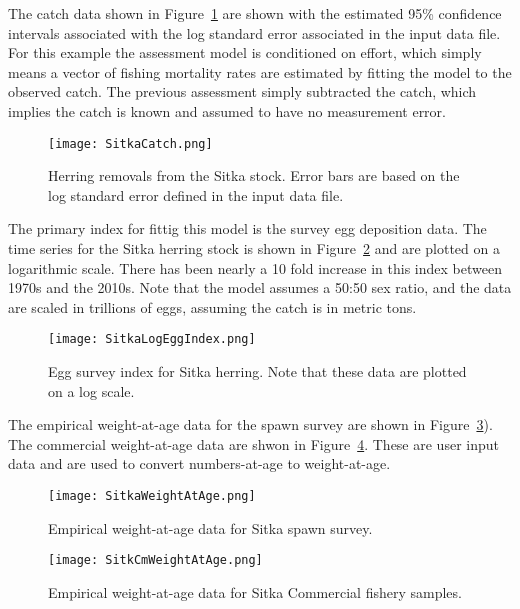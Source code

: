 \documentclass[12pt,letterpaper]{article}
\begin{document}
  The catch data shown in Figure~\ref{fig:SitkaCatch} are shown with the estimated 95\% confidence intervals associated with the log standard error associated in the input data file.  For this example the assessment model is conditioned on effort, which simply means a vector of fishing mortality rates are estimated by fitting the model to the observed catch.  The previous assessment simply subtracted the catch, which implies the catch is known and assumed to have no measurement error. 



  \begin{figure}[tb]
    \centering
    \texttt{[image: SitkaCatch.png]}
    \caption{Herring removals from the Sitka stock. Error bars are based on the log standard error defined in the input data file.}
    \label{fig:SitkaCatch}
  \end{figure}

  The primary index for fittig this model is the survey egg deposition data. The time series for the Sitka herring stock is shown in Figure~\ref{fig:SitkaEggIndex} and are plotted on a logarithmic scale.  There has been nearly a 10 fold increase in this index between 1970s and the 2010s.  Note that the model assumes a 50:50 sex ratio, and the data are scaled in trillions of eggs, assuming the catch is in metric tons.


  \begin{figure}[tb]
    \centering
    \texttt{[image: SitkaLogEggIndex.png]}
    \caption{Egg survey index for Sitka herring. Note that these data are plotted on a log scale.}
    \label{fig:SitkaEggIndex}
  \end{figure}


  The empirical weight-at-age data for the spawn survey are shown in Figure~\ref{fig:SitkaWeightAtAge}).  The commercial weight-at-age data are shwon in Figure~\ref{fig:SitkCmWeighAtAge}. These are user input data and are used to convert numbers-at-age to weight-at-age.

  \begin{figure}[tb]
    \centering
    \texttt{[image: SitkaWeightAtAge.png]}
    \caption{Empirical weight-at-age data for Sitka spawn survey.}
    \label{fig:SitkaWeightAtAge}
  \end{figure}

  \begin{figure}[tb]
    \centering
    \texttt{[image: SitkCmWeightAtAge.png]}
    \caption{Empirical weight-at-age data for Sitka Commercial fishery samples.}
    \label{fig:SitkCmWeighAtAge}
  \end{figure}
\end{document}

